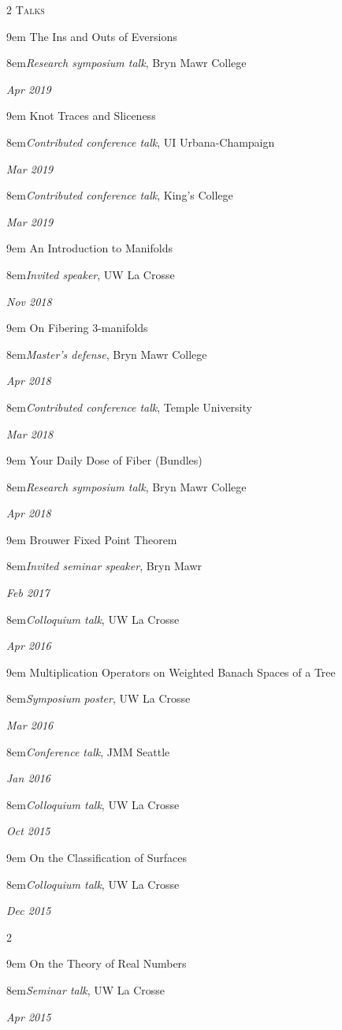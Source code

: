 \documentclass[11pt]{article}
\newcommand{\itemreg}[1]{\begin{addmargin}[0em]{9em} #1 \end{addmargin}}
\newcommand{\iteminddate}[2]{\begin{addmargin}[1.75em]{8em}#1\end{addmargin}\vspace{-1.5em}\hfill\textit{#2}\\ \vspace{.25em}}
\begin{document}
\begin{multicols}{2}
	\textsc{Talks}
	
	\columnbreak
	
	\itemreg{The Ins and Outs of Eversions}
		\iteminddate{\textit{Research symposium talk}, Bryn Mawr College}{Apr 2019}
		\vspace{.35em}
	\itemreg{Knot Traces and Sliceness}
		\iteminddate{\textit{Contributed conference talk}, UI Urbana-Champaign}{Mar 2019}
		\iteminddate{\textit{Contributed conference talk}, King's College}{Mar 2019}
		\vspace{.35em}
	\itemreg{An Introduction to Manifolds}
		\iteminddate{\textit{Invited speaker}, UW La Crosse}{Nov 2018}
		\vspace{.35em}
	\itemreg{On Fibering 3-manifolds}
		\iteminddate{\textit{Master's defense}, Bryn Mawr College}{Apr 2018}
		\iteminddate{\textit{Contributed conference talk}, Temple University}{Mar 2018}
		\vspace{.35em}
	\itemreg{Your Daily Dose of Fiber (Bundles)}
		\iteminddate{\textit{Research symposium talk}, Bryn Mawr College}{Apr 2018}
		\vspace{.35em}
	\itemreg{Brouwer Fixed Point Theorem}
		\iteminddate{\textit{Invited seminar speaker}, Bryn Mawr}{Feb 2017}
		\iteminddate{\textit{Colloquium talk}, UW La Crosse}{Apr 2016}
		\vspace{.35em}
	\itemreg{Multiplication Operators on Weighted Banach Spaces of a Tree}
		\iteminddate{\textit{Symposium poster}, UW La Crosse}{Mar 2016}
		\iteminddate{\textit{Conference talk}, JMM Seattle}{Jan 2016}
		\iteminddate{\textit{Colloquium talk}, UW La Crosse}{Oct 2015}
		\vspace{.35em}
	\itemreg{On the Classification of Surfaces}
		\iteminddate{\textit{Colloquium talk}, UW La Crosse}{Dec 2015}
\end{multicols}
\clearpage
\begin{multicols}{2}
	\null
	
	\columnbreak
	
	\itemreg{On the Theory of Real Numbers}
		\iteminddate{\textit{Seminar talk}, UW La Crosse}{Apr 2015}
\end{multicols}
\vspace{-.5em}
\end{document}

